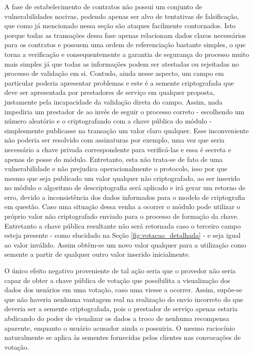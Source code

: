 A fase de estabelecimento de contratos não possui um conjunto de vulnerabilidades nocivas, podendo apenas ser alvo de tentativas de falsificação, que como já mencionado nessa seção são ataques facilmente contornados. Isto porque todas as transações dessa fase apenas relacionam dados claros necessários para os contratos e possuem uma ordem de referenciação bastante simples, o que torna a verificação e consequentemente a garantia de segurança do processo muito mais simples já que todas as informações podem ser atestadas ou rejeitadas no processo de validação em si. Contudo, ainda nesse aspecto, um campo em particular poderia apresentar problemas e este é a semente criptografada que deve ser apresentada por prestadores de serviço em qualquer proposta, justamente pela incapacidade da validação direta do campo. Assim, nada impediria um prestador de ao invés de seguir o processo correto - escolhendo um número aleatório e o criptografando com a chave pública do módulo - simplesmente publicasse na transação um valor claro qualquer. Esse inconveniente não poderia ser resolvido com assinaturas por exemplo, uma vez que seria necessário a chave privada correspondente para verificá-las e essa é secreta e apenas de posse do módulo. Entretanto, esta não trata-se de fato de uma vulnerabilidade e não prejudica operacionalmente o protocolo, isso por que mesmo que seja publicado um valor qualquer não criptografado, ao ser inserido no módulo o algoritmo de descriptografia será aplicado e irá gerar um retorno de erro, devido a inconsistência dos dados informados para o modelo de criptografia em questão. Caso uma situação dessa venha a ocorrer o módulo pode utilizar o próprio valor não criptografado enviado para o processo de formação da chave. Entretanto a chave pública resultante não será retornada caso o terceiro campo esteja presente - como elucidado na Seção \ref{fig:votacao_detalhada} - e seja igual ao valor inválido. Assim obtêm-se um novo valor qualquer para a utilização como semente a partir de qualquer outro valor inserido inicialmente.

O único efeito negativo proveniente de tal ação seria que o provedor não seria capaz de obter a chave pública de votação que possibilita a visualização dos dados dos usuários em uma votação, caso uma viesse a ocorrer. Assim, supõe-se que não haveria nenhuma vantagem real na realização do envio incorreto do que deveria ser a semente criptografada, pois o prestador de serviço apenas estaria abdicando do poder de visualizar os dados a troco de nenhuma recompensa aparente, enquanto o usuário acusador ainda o possuiria. O mesmo raciocínio naturalmente se aplica às sementes fornecidas pelos clientes nas convocações de votação.

